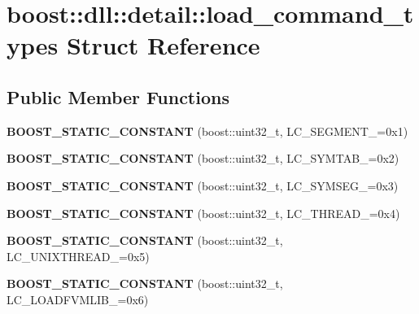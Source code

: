 \hypertarget{a01552}{}\section{boost\+:\+:dll\+:\+:detail\+:\+:load\+\_\+command\+\_\+types Struct Reference}
\label{a01552}
\subsection*{Public Member Functions}
\begin{DoxyCompactItemize}
\item 
\mbox{\label{a01552_a37af740c72aa8928ea08b7b028d7ac23}} 
{\bfseries B\+O\+O\+S\+T\+\_\+\+S\+T\+A\+T\+I\+C\+\_\+\+C\+O\+N\+S\+T\+A\+NT} (boost\+::uint32\+\_\+t, L\+C\+\_\+\+S\+E\+G\+M\+E\+N\+T\+\_\+=0x1)
\item 
\mbox{\label{a01552_a7a69d7d9fa498d1a3efe6825c2787336}} 
{\bfseries B\+O\+O\+S\+T\+\_\+\+S\+T\+A\+T\+I\+C\+\_\+\+C\+O\+N\+S\+T\+A\+NT} (boost\+::uint32\+\_\+t, L\+C\+\_\+\+S\+Y\+M\+T\+A\+B\+\_\+=0x2)
\item 
\mbox{\label{a01552_a88e5d748f22fb6b63acf0e04fc5cfd96}} 
{\bfseries B\+O\+O\+S\+T\+\_\+\+S\+T\+A\+T\+I\+C\+\_\+\+C\+O\+N\+S\+T\+A\+NT} (boost\+::uint32\+\_\+t, L\+C\+\_\+\+S\+Y\+M\+S\+E\+G\+\_\+=0x3)
\item 
\mbox{\label{a01552_a1cabaca254df2f28ea5e33e35511bf95}} 
{\bfseries B\+O\+O\+S\+T\+\_\+\+S\+T\+A\+T\+I\+C\+\_\+\+C\+O\+N\+S\+T\+A\+NT} (boost\+::uint32\+\_\+t, L\+C\+\_\+\+T\+H\+R\+E\+A\+D\+\_\+=0x4)
\item 
\mbox{\label{a01552_a8bcd23c5397bfc91cd90da9d0d437816}} 
{\bfseries B\+O\+O\+S\+T\+\_\+\+S\+T\+A\+T\+I\+C\+\_\+\+C\+O\+N\+S\+T\+A\+NT} (boost\+::uint32\+\_\+t, L\+C\+\_\+\+U\+N\+I\+X\+T\+H\+R\+E\+A\+D\+\_\+=0x5)
\item 
\mbox{\label{a01552_aa7b6b99f240568ce2376a0a21097fb5a}} 
{\bfseries B\+O\+O\+S\+T\+\_\+\+S\+T\+A\+T\+I\+C\+\_\+\+C\+O\+N\+S\+T\+A\+NT} (boost\+::uint32\+\_\+t, L\+C\+\_\+\+L\+O\+A\+D\+F\+V\+M\+L\+I\+B\+\_\+=0x6)
\item 
\mbox{\label{a01552_a021af84fa3c6d7a0ae132277d99e82a8}} 

\end{DoxyCompactItemize}
